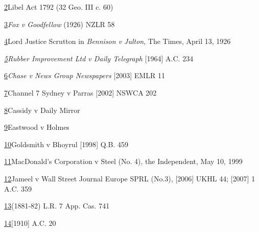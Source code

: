 \documentclass[]{article}
\begin{document}
\hyperref[sdfootnote2anc]{2}Libel Act 1792 (32 Geo. III c. 60)

\hyperref[sdfootnote3anc]{3}\emph{Fox v Goodfellow} (1926) NZLR 58

\hyperref[sdfootnote4anc]{4}Lord Justice Scrutton in \emph{Bennison v
Julton}{, The Times, April 13, 1926}

\emph{\hyperref[sdfootnote5anc]{5}Rubber Improvement Ltd v Daily
Telegraph}{ {[}1964{]} A.C. 234}

\hyperref[sdfootnote6anc]{6}\emph{Chase v News Group Newspapers}
{[}2003{]} EMLR 11

\hyperref[sdfootnote7anc]{7}Channel 7 Sydney v Parras {[}2002{]} NSWCA
202

\hyperref[sdfootnote8anc]{8}Cassidy v Daily Mirror

\hyperref[sdfootnote9anc]{9}Eastwood v Holmes

\hyperref[sdfootnote10anc]{10}Goldsmith v Bhoyrul {[}1998{]} Q.B. 459

\hyperref[sdfootnote11anc]{11}MacDonald's Corporation v Steel (No. 4),
the Independent, May 10, 1999

\hyperref[sdfootnote12anc]{12}Jameel v Wall Street Journal Europe SPRL
(No.3), {[}2006{]} UKHL 44; {[}2007{]} 1 A.C. 359

\hyperref[sdfootnote13anc]{13}(1881-82) L.R. 7 App. Cas. 741

\hyperref[sdfootnote14anc]{14}{[}1910{]} A.C. 20
\end{document}
